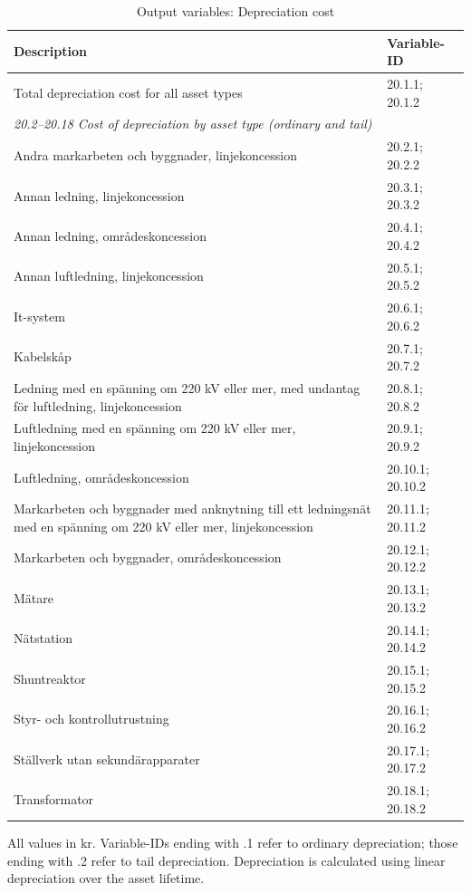 \begin{table}[H]
\centering
\footnotesize
\begin{threeparttable}
\caption{Output variables: Depreciation cost}
\label{tab:depreciation-variables}
\begin{tabular}{@{}p{9cm}l@{}}
\toprule
\textbf{Description} & \textbf{Variable-ID} \\
\midrule
Total depreciation cost for all asset types & 20.1.1; 20.1.2 \\
\midrule
\multicolumn{2}{l}{\textit{20.2--20.18 Cost of depreciation by asset type (ordinary and tail)}} \\
Andra markarbeten och byggnader, linjekoncession & 20.2.1; 20.2.2 \\
Annan ledning, linjekoncession & 20.3.1; 20.3.2 \\
Annan ledning, områdeskoncession & 20.4.1; 20.4.2 \\
Annan luftledning, linjekoncession & 20.5.1; 20.5.2 \\
It-system & 20.6.1; 20.6.2 \\
Kabelskåp & 20.7.1; 20.7.2 \\
Ledning med en spänning om 220 kV eller mer, med undantag för luftledning, linjekoncession & 20.8.1; 20.8.2 \\
Luftledning med en spänning om 220 kV eller mer, linjekoncession & 20.9.1; 20.9.2 \\
Luftledning, områdeskoncession & 20.10.1; 20.10.2 \\
Markarbeten och byggnader med anknytning till ett ledningsnät med en spänning om 220 kV eller mer, linjekoncession & 20.11.1; 20.11.2 \\
Markarbeten och byggnader, områdeskoncession & 20.12.1; 20.12.2 \\
Mätare & 20.13.1; 20.13.2 \\
Nätstation & 20.14.1; 20.14.2 \\
Shuntreaktor & 20.15.1; 20.15.2 \\
Styr- och kontrollutrustning & 20.16.1; 20.16.2 \\
Ställverk utan sekundärapparater & 20.17.1; 20.17.2 \\
Transformator & 20.18.1; 20.18.2 \\
\bottomrule
\end{tabular}
\begin{tablenotes}
\item All values in kr. Variable-IDs ending with .1 refer to ordinary depreciation; those ending with .2 refer to tail depreciation. Depreciation is calculated using linear depreciation over the asset lifetime.
\end{tablenotes}
\end{threeparttable}
\end{table}


